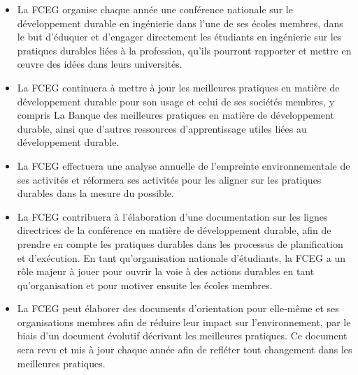 \begin{itemize}
 \item La FCEG organise chaque année une conférence nationale sur le développement durable en ingénierie dans l'une de ses écoles membres, dans le but d'éduquer et d'engager directement les étudiants en ingénierie sur les pratiques durables liées à la profession, qu'ils pourront rapporter et mettre en œuvre des idées dans leurs universités.
 \item La FCEG continuera à mettre à jour les meilleures pratiques en matière de développement durable pour son usage et celui de ses sociétés membres, y compris La Banque des meilleures pratiques en matière de développement durable, ainsi que d'autres ressources d'apprentissage utiles liées au développement durable.
\end{itemize}

\begin{itemize}
 \item La FCEG effectuera une analyse annuelle de l'empreinte environnementale de ses activités et réformera ses activités pour les aligner sur les pratiques durables dans la mesure du possible.
 \item La FCEG contribuera à l'élaboration d'une documentation sur les lignes directrices de la conférence en matière de développement durable, afin de prendre en compte les pratiques durables dans les processus de planification et d'exécution. En tant qu'organisation nationale d'étudiants, la FCEG a un rôle majeur à jouer pour ouvrir la voie à des actions durables en tant qu'organisation et pour motiver ensuite les écoles membres.
 \item La FCEG peut élaborer des documents d'orientation pour elle-même et ses organisations membres afin de réduire leur impact sur l'environnement, par le biais d'un document évolutif décrivant les meilleures pratiques. Ce document sera revu et mis à jour chaque année afin de refléter tout changement dans les meilleures pratiques.
\end{itemize}

\newpage

